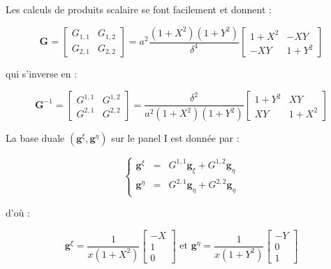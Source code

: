 Les calculs de produits scalaire se font facilement et donnent :

\begin{equation}
\mathbf{G} = \begin{bmatrix}
G_{1,1} & G_{1,2} \\ G_{2,1} & G_{2,2}
\end{bmatrix} 
= a^2 \dfrac{(1+X^2)(1+Y^2)}{\delta^4} \begin{bmatrix}
1+X^2 & -XY \\ -XY & 1+Y^2
\end{bmatrix}
\end{equation}

qui s'inverse en :

\begin{equation}
\mathbf{G}^{-1} = \begin{bmatrix}
G^{1,1} & G^{1,2} \\ G^{2,1} & G^{2,2}
\end{bmatrix} = \dfrac{\delta^2}{a^2 (1+X^2)(1+Y^2)} \begin{bmatrix}
1+Y^2 & XY \\ XY & 1+X^2
\end{bmatrix}
\label{eq: metrique inverse}
\end{equation}

La base duale $(\mathbf{g}^{\xi}, \mathbf{g}^{\eta})$ sur le panel I est donnée par :

\begin{equation}
\left\lbrace
\begin{array}{rcl}
\mathbf{g}^{\xi} & = & G^{1,1} \mathbf{g}_{\xi} + G^{1,2} \mathbf{g}_{\eta} \\
\mathbf{g}^{\eta} & = & G^{2,1} \mathbf{g}_{\eta} + G^{2,2} \mathbf{g}_{\eta}
\end{array}
\right.
\end{equation}

d'où :

\begin{equation}
\mathbf{g}^{\xi} = \dfrac{1}{x(1+X^2)}\begin{bmatrix}
-X \\ 1 \\ 0
\end{bmatrix} \text{ et } \mathbf{g}^{\eta} = \dfrac{1}{x(1+Y^2)}\begin{bmatrix}
-Y \\ 0 \\ 1
\end{bmatrix}
\label{eq: base duale I}
\end{equation}




